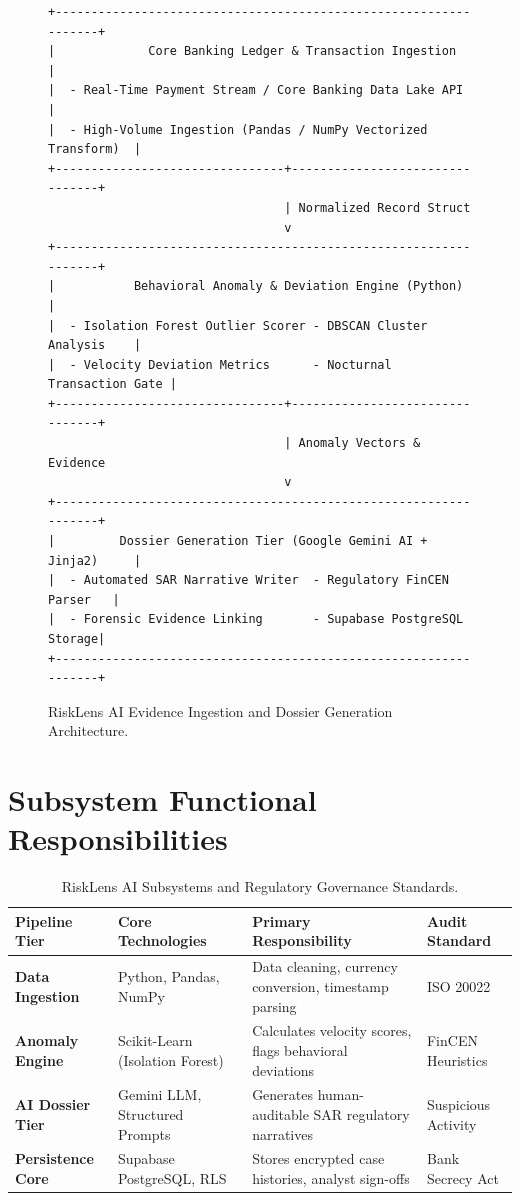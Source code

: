 \documentclass[12pt,a4paper]{report}
\begin{document}
\begin{figure}[htbp]
\centering
\footnotesize
\begin{verbatim}
+-----------------------------------------------------------------+
|             Core Banking Ledger & Transaction Ingestion         |
|  - Real-Time Payment Stream / Core Banking Data Lake API        |
|  - High-Volume Ingestion (Pandas / NumPy Vectorized Transform)  |
+--------------------------------+--------------------------------+
                                 | Normalized Record Struct
                                 v
+-----------------------------------------------------------------+
|           Behavioral Anomaly & Deviation Engine (Python)        |
|  - Isolation Forest Outlier Scorer - DBSCAN Cluster Analysis    |
|  - Velocity Deviation Metrics      - Nocturnal Transaction Gate |
+--------------------------------+--------------------------------+
                                 | Anomaly Vectors & Evidence
                                 v
+-----------------------------------------------------------------+
|         Dossier Generation Tier (Google Gemini AI + Jinja2)     |
|  - Automated SAR Narrative Writer  - Regulatory FinCEN Parser   |
|  - Forensic Evidence Linking       - Supabase PostgreSQL Storage|
+-----------------------------------------------------------------+
\end{verbatim}
\caption{RiskLens AI Evidence Ingestion and Dossier Generation Architecture.}
\label{fig:risklens_topology}
\end{figure}

\section{Subsystem Functional Responsibilities}

\begin{table}[htbp]
\centering
\small
\begin{tabularx}{\linewidth}{>{\raggedright\arraybackslash\bfseries}p{2.3cm}>{\raggedright\arraybackslash}X>{\raggedright\arraybackslash}X>{\raggedright\arraybackslash}p{2.0cm}}
\toprule
Pipeline Tier & Core Technologies & Primary Responsibility & Audit Standard \\
\midrule
Data Ingestion & Python, Pandas, NumPy & Data cleaning, currency conversion, timestamp parsing & ISO 20022 \\
\addlinespace
Anomaly Engine & Scikit-Learn (Isolation Forest) & Calculates velocity scores, flags behavioral deviations & FinCEN Heuristics \\
\addlinespace
AI Dossier Tier & Gemini LLM, Structured Prompts & Generates human-auditable SAR regulatory narratives & Suspicious Activity \\
\addlinespace
Persistence Core & Supabase PostgreSQL, RLS & Stores encrypted case histories, analyst sign-offs & Bank Secrecy Act \\
\bottomrule
\end{tabularx}
\caption{RiskLens AI Subsystems and Regulatory Governance Standards.}
\label{tab:risklens_subsystems}
\end{table}
\end{document}
